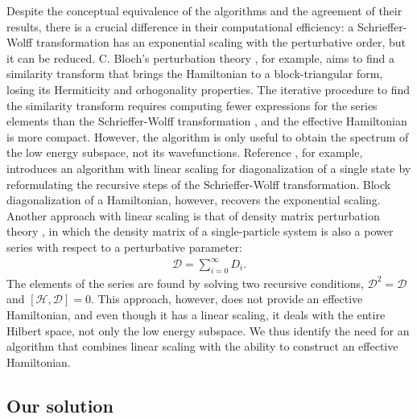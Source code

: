 Despite the conceptual equivalence of the algorithms and the agreement of their
results, there is a crucial difference in their computational efficiency: a
Schrieffer-Wolff transformation has an exponential scaling with the
perturbative order, but it can be reduced.
C. Bloch's perturbation theory \cite{Bloch_1958}, for example,
aims to find a similarity transform that brings the Hamiltonian to a
block-triangular form, losing its Hermiticity and orhogonality properties.
The iterative procedure to find the similarity transform requires computing
fewer expressions for the series elements than the Schrieffer-Wolff
transformation \cite{Bravyi_2011}, and the effective Hamiltonian is more
compact.
However, the algorithm is only useful to obtain the spectrum of the low energy
subspace, not its wavefunctions.
Reference \cite{Li_2022}, for example, introduces an
algorithm with linear scaling for diagonalization of a single state by
reformulating the recursive steps of the Schrieffer-Wolff transformation.
Block diagonalization of a Hamiltonian, however, recovers the exponential
scaling.
Another approach with linear scaling is that of density matrix perturbation
theory \cite{McWeeny_1962,McWeeny_1968,Truflandier_2020}, in which the
density matrix of a single-particle system is also a power series with
respect to a perturbative parameter:
%
\begin{align}
  \mathcal{D} = \sum_{i=0}^{\infty} D_i.
\end{align}
%
The elements of the series are found by solving two recursive conditions,
$\mathcal{D}^2 = \mathcal{D}$ and $[\mathcal{H}, \mathcal{D}]=0$.
This approach, however, does not provide an effective Hamiltonian, and even
though it has a linear scaling, it deals with the entire Hilbert space, not
only the low energy subspace.
We thus identify the need for an algorithm that combines linear scaling with
the ability to construct an effective Hamiltonian.

\subsection{Our solution}

